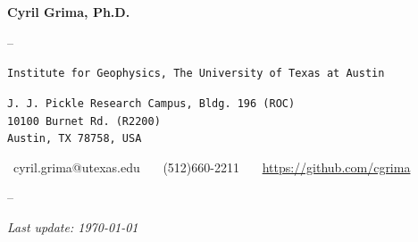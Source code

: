 \begin{center}

{\LARGE \textbf{Cyril Grima, Ph.D.}}
\vspace{.5em}

\hspace{0pt}{\large Research Associate Professor}

--

\noindent\hspace{0pt}\texttt{Institute for Geophysics, The University of Texas at Austin}

\noindent\hspace{0pt}\texttt{J. J. Pickle Research Campus, Bldg. 196 (ROC) \\
10100 Burnet Rd. (R2200) \\
Austin, TX 78758, USA}
\vspace{.5em}

\noindent\hspace{0pt}\faInbox \ cyril.grima@utexas.edu \ \ \faPhone \ (512)660-2211 
\ \ \faGithub \ \href{https://github.com/cgrima}{https://github.com/cgrima}

--

\textit{Last update: \today}

\end{center}
\vspace{-1em}